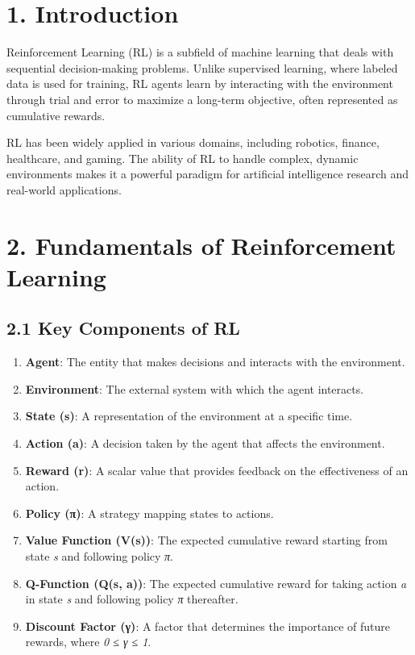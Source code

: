 \documentclass[
]{book}
\providecommand{\tightlist}{%
  \setlength{\itemsep}{0pt}\setlength{\parskip}{0pt}}
\begin{document}
\section{\texorpdfstring{\textbf{1. Introduction}}{1. Introduction}}\label{introduction-2}

Reinforcement Learning (RL) is a subfield of machine learning that deals with sequential decision-making problems. Unlike supervised learning, where labeled data is used for training, RL agents learn by interacting with the environment through trial and error to maximize a long-term objective, often represented as cumulative rewards.

RL has been widely applied in various domains, including robotics, finance, healthcare, and gaming. The ability of RL to handle complex, dynamic environments makes it a powerful paradigm for artificial intelligence research and real-world applications.

\section{\texorpdfstring{\textbf{2. Fundamentals of Reinforcement Learning}}{2. Fundamentals of Reinforcement Learning}}\label{fundamentals-of-reinforcement-learning}

\subsection{\texorpdfstring{\textbf{2.1 Key Components of RL}}{2.1 Key Components of RL}}\label{key-components-of-rl}

\begin{enumerate}
\def\labelenumi{\arabic{enumi}.}
\tightlist
\item
  \textbf{Agent}: The entity that makes decisions and interacts with the environment.
\item
  \textbf{Environment}: The external system with which the agent interacts.
\item
  \textbf{State (s)}: A representation of the environment at a specific time.
\item
  \textbf{Action (a)}: A decision taken by the agent that affects the environment.
\item
  \textbf{Reward (r)}: A scalar value that provides feedback on the effectiveness of an action.
\item
  \textbf{Policy (π)}: A strategy mapping states to actions.
\item
  \textbf{Value Function (V(s))}: The expected cumulative reward starting from state \emph{s} and following policy \emph{π}.
\item
  \textbf{Q-Function (Q(s, a))}: The expected cumulative reward for taking action \emph{a} in state \emph{s} and following policy \emph{π} thereafter.
\item
  \textbf{Discount Factor (γ)}: A factor that determines the importance of future rewards, where \emph{0 ≤ γ ≤ 1}.
\end{enumerate}
\end{document}
